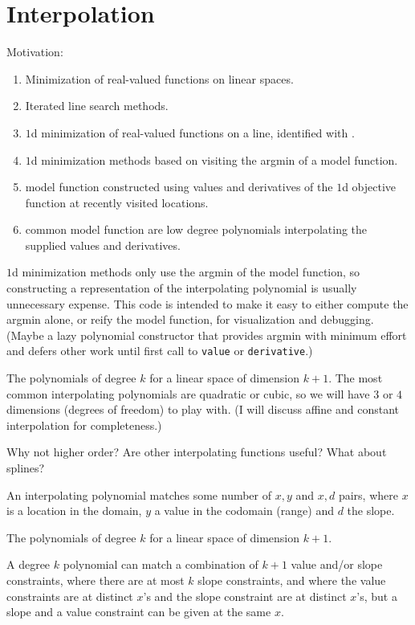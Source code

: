 \chapter{Interpolation}\label{ch:Interpolation}

Motivation: 
\begin{enumerate}
 \item Minimization of real-valued functions on linear spaces.
 \item Iterated line search methods.
 \item $1$d minimization of real-valued functions on a line,
 identified with .
 \item $1$d minimization methods based on visiting the
 argmin of a model function.
 \item model function constructed using values and derivatives
 of the $1$d objective function at recently visited locations.
 \item common model function are low degree polynomials 
 interpolating the supplied values and derivatives.
\end{enumerate}

$1$d minimization methods only use the argmin of the model 
function, so constructing a representation of the interpolating 
polynomial is usually unnecessary expense.
This code is intended to make it easy to either 
compute the argmin alone,
or reify the model function, for visualization and debugging.
(Maybe a lazy polynomial constructor that provides argmin with
minimum effort and defers other work until first call to 
\texttt{value} or \texttt{derivative}.)

The polynomials of degree $k$ for a linear space of dimension
$k+1$\cite{wiki:polynomial}.
The most common interpolating polynomials are quadratic or cubic,
so we will have $3$ or $4$ dimensions (degrees of freedom) to play
with. 
(I will discuss affine and constant interpolation for 
completeness.)

Why not higher order? Are other interpolating functions useful?
What about splines?

An interpolating polynomial matches some number of $x,y$
and $x,d$ pairs, where $x$ is a location in the domain,
$y$ a value in the codomain (range) and $d$ the slope.

The polynomials of degree $k$ for a linear space of dimension
$k+1$. 

A degree $k$ polynomial can match a combination of $k+1$ value 
and/or 
slope constraints, where there are at most $k$ slope constraints,
and where the value constraints are at distinct $x$'s and the
slope constraint are at distinct $x$'s, but a slope and a value 
constraint can be given at the same $x$.

